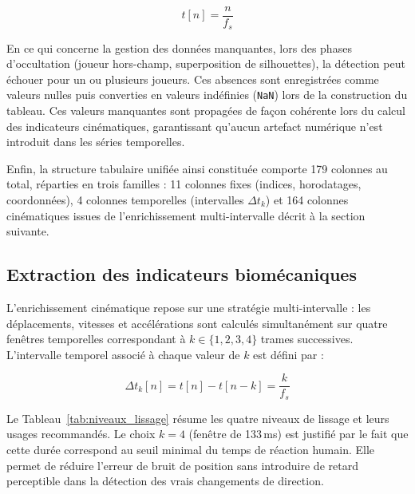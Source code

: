 \begin{equation}
  t[n] = \frac{n}{f_s}
  \label{eq:horodatage}
\end{equation}

En ce qui concerne la gestion des données manquantes, lors des phases d'occultation (joueur
hors-champ, superposition de silhouettes), la détection peut échouer pour un ou plusieurs
joueurs. Ces absences sont enregistrées comme valeurs nulles puis converties en valeurs
indéfinies (\texttt{NaN}) lors de la construction du tableau. Ces valeurs manquantes sont
propagées de façon cohérente lors du calcul des indicateurs cinématiques, garantissant
qu'aucun artefact numérique n'est introduit dans les séries temporelles.

Enfin, la structure tabulaire unifiée ainsi constituée comporte 179 colonnes au total,
réparties en trois familles : 11 colonnes fixes (indices, horodatages, coordonnées),
4 colonnes temporelles (intervalles $\Delta t_k$) et 164 colonnes cinématiques issues de
l'enrichissement multi-intervalle décrit à la section suivante.

\subsection{Extraction des indicateurs biomécaniques}

L'enrichissement cinématique repose sur une stratégie multi-intervalle : les déplacements,
vitesses et accélérations sont calculés simultanément sur quatre fenêtres temporelles
correspondant à $k \in \{1, 2, 3, 4\}$ trames successives. L'intervalle temporel associé à
chaque valeur de $k$ est défini par :

\begin{equation}
  \Delta t_k[n] = t[n] - t[n-k] = \frac{k}{f_s}
  \label{eq:intervalle}
\end{equation}

Le Tableau~\ref{tab:niveaux_lissage} résume les quatre niveaux de lissage et leurs usages
recommandés. Le choix $k = 4$ (fenêtre de 133\,ms) est justifié par le fait que cette durée
correspond au seuil minimal du temps de réaction humain. Elle permet de réduire l'erreur de
bruit de position sans introduire de retard perceptible dans la détection des vrais
changements de direction.

